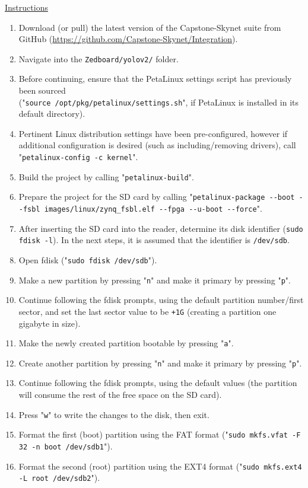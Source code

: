 \documentclass[10pt,letterpaper]{article}
\begin{document}
\underline{Instructions}
\begin{enumerate}
\item Download (or pull) the latest version of the Capstone-Skynet suite from GitHub (\url{https://github.com/Capstone-Skynet/Integration}).
\item Navigate into the \texttt{Zedboard/yolov2/} folder. 
\item Before continuing, ensure that the PetaLinux settings script has previously been sourced\\ ("\texttt{source /opt/pkg/petalinux/settings.sh}", if PetaLinux is installed in its default directory).
\item Pertinent Linux distribution settings have been pre-configured, however if additional configuration is desired (such as including/removing drivers), call "\texttt{petalinux-config -c kernel}".
\item Build the project by calling "\texttt{petalinux-build}".
\item Prepare the project for the SD card by calling "\texttt{petalinux-package -{}-boot -{}-fsbl images/linux/zynq\_fsbl.elf -{}-fpga -{}-u-boot -{}-force}".
\item After inserting the SD card into the reader, determine its disk identifier (\texttt{sudo fdisk -l}). In the next steps, it is assumed that the identifier is \texttt{/dev/sdb}.
\item Open fdisk ("\texttt{sudo fdisk /dev/sdb}").
\item Make a new partition by pressing "\texttt{n}" and make it primary by pressing "\texttt{p}".
\item Continue following the fdisk prompts, using the default partition number/first sector, and set the last sector value to be \texttt{+1G} (creating a partition one gigabyte in size).
\item Make the newly created partition bootable by pressing "\texttt{a}".
\item Create another partition by pressing "\texttt{n}" and make it primary by pressing "\texttt{p}".
\item Continue following the fdisk prompts, using the default values (the partition will consume the rest of the free space on the SD card).
\item Press "\texttt{w}" to write the changes to the disk, then exit.
\item Format the first (boot) partition using the FAT format ("\texttt{sudo mkfs.vfat -F 32 -n boot /dev/sdb1}").
\item Format the second (root) partition using the EXT4 format ("\texttt{sudo mkfs.ext4 -L root /dev/sdb2}").

\end{enumerate}
\end{document}
